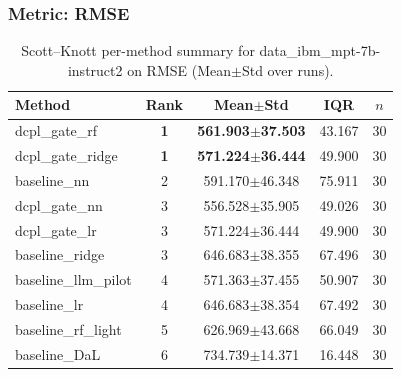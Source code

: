 \subsubsection*{Metric: RMSE}
\begin{table}[H]
\centering
\scriptsize
\setlength{\tabcolsep}{4pt}
\renewcommand{\arraystretch}{1.1}
\caption{Scott--Knott per-method summary for data\_ibm\_mpt-7b-instruct2 on RMSE (Mean$\pm$Std over runs).}
\label{tab:sk_data_ibm_mpt-7b-instruct2_RMSE}
\begin{tabular}{l|c|c|c|c}
\hline
\textbf{Method} & \textbf{Rank} & \textbf{Mean$\pm$Std} & \textbf{IQR} & \textbf{$n$} \\
\hline
\rowcolor{red!15} dcpl\_gate\_rf & \textbf{1} & \textbf{561.903$\pm$37.503} & 43.167 & 30 \\
\rowcolor{red!15} dcpl\_gate\_ridge & \textbf{1} & \textbf{571.224$\pm$36.444} & 49.900 & 30 \\
baseline\_nn & 2 & 591.170$\pm$46.348 & 75.911 & 30 \\
dcpl\_gate\_nn & 3 & 556.528$\pm$35.905 & 49.026 & 30 \\
dcpl\_gate\_lr & 3 & 571.224$\pm$36.444 & 49.900 & 30 \\
baseline\_ridge & 3 & 646.683$\pm$38.355 & 67.496 & 30 \\
baseline\_llm\_pilot & 4 & 571.363$\pm$37.455 & 50.907 & 30 \\
baseline\_lr & 4 & 646.683$\pm$38.354 & 67.492 & 30 \\
baseline\_rf\_light & 5 & 626.969$\pm$43.668 & 66.049 & 30 \\
baseline\_DaL & 6 & 734.739$\pm$14.371 & 16.448 & 30 \\
\hline
\end{tabular}
\end{table}

